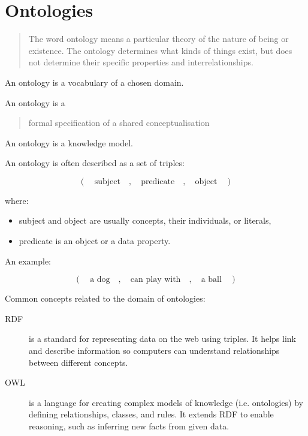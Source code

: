 \section{Ontologies}

\begin{frame}{\insertsection}
    \blockquote[{{\cite[p. 290]{russell2022ArtificialIntelligenceModern}}}]{The word ontology means a particular theory of the nature of being or existence. The ontology determines what kinds of things exist, but does not determine their specific properties and interrelationships.}
    
    \medskip
    
    An ontology is a vocabulary of a chosen domain.

    \medskip

    An ontology is a \blockquote[\cite{guarino2009WhatOntology,borst1997ConstructionEngineeringOntologies}]{formal specification of a shared conceptualisation}.

    \medskip

    An ontology is a knowledge model.
    
\end{frame}

\begin{frame}{\insertsection}
    An ontology is often described as a set of \alert{triples}:

    $$(\quad\text{subject}\quad,\quad\text{predicate}\quad,\quad\text{object}\quad)$$

    where:
    \begin{itemize}
        \item subject and object are usually \alert{concepts}, their individuals, or literals,
        
        \item predicate is an object or a data \alert{property}.
    \end{itemize}

    \medskip
    An example:

    $$(\quad\text{a dog}\quad,\quad\text{can play with}\quad,\quad\text{a ball}\quad)$$
\end{frame}

\begin{frame}{\insertsection}
    Common concepts related to the domain of ontologies:

    \begin{description}
        \item [\Ac{RDF}] is a standard for representing data on the web using triples. It helps link and describe information so computers can understand relationships between different concepts.

        \item [\Ac{OWL}] is a language for creating complex models of knowledge (i.e. ontologies) by defining relationships, classes, and rules. It extends RDF to enable reasoning, such as inferring new facts from given data.
    \end{description}
\end{frame}

